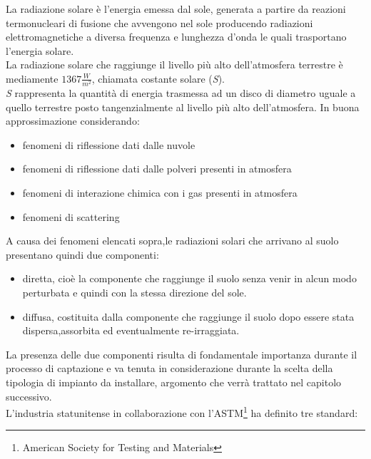 La radiazione solare è l'energia emessa dal sole, generata a partire da reazioni termonucleari di fusione che avvengono nel sole producendo radiazioni elettromagnetiche a diversa frequenza e lunghezza d'onda le quali trasportano l'energia solare.\\
La radiazione solare che raggiunge il livello più alto dell'atmosfera terrestre è mediamente \(1367\frac{W}{m^2}\), chiamata costante solare (\textit{S}).\\
\textit{S} rappresenta la quantità di energia trasmessa ad un disco di diametro uguale a quello terrestre posto tangenzialmente al livello più alto dell'atmosfera.
\newpage\noindent
In buona approssimazione considerando\cite{captazione-enegia-solare}:
\begin{itemize}
    \item fenomeni di riflessione dati dalle nuvole
    \item fenomeni di riflessione dati dalle polveri presenti in atmosfera
    \item fenomeni di interazione chimica con i gas presenti in atmosfera
    \item fenomeni di scattering
\end{itemize}
A causa dei fenomeni elencati sopra,le radiazioni solari che arrivano al suolo presentano quindi due componenti:
\begin{itemize}
    \item diretta, cioè la componente che raggiunge il suolo senza venir in alcun modo perturbata e quindi con la stessa direzione del sole.
    \item diffusa, costituita dalla componente che raggiunge il suolo dopo essere stata dispersa,assorbita ed eventualmente re-irraggiata.
\end{itemize}
La presenza delle due componenti risulta di fondamentale importanza durante il processo di captazione e va tenuta in considerazione durante la scelta della tipologia di impianto da installare, argomento che verrà trattato nel capitolo successivo.\\
L'industria statunitense in collaborazione con l'ASTM\footnote{American Society for Testing and Materials} ha definito tre standard:
